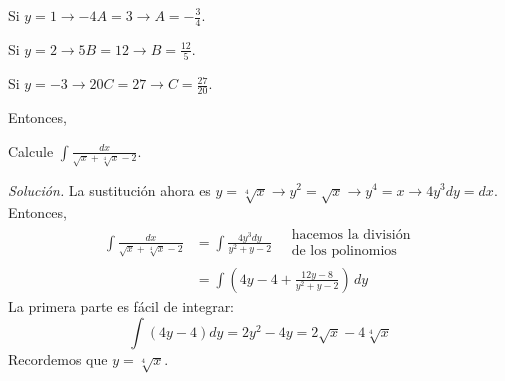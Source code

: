 Si $y=1 \rightarrow -4A=3\rightarrow A=-\frac{3}{4}$.

Si $y=2\rightarrow 5B=12\rightarrow B=\frac{12}{5}$.

Si $y=-3\rightarrow 20C=27\rightarrow C=\frac{27}{20}$.

Entonces,




\begin{ejemplo}
Calcule $\displaystyle{\int \frac{dx}{\sqrt{x}+\sqrt[4]{x}-2}}$.
\end{ejemplo}
\textit{Solución.} La sustitución ahora es $y=\sqrt[4]{x}\rightarrow y^{2}=\sqrt{x}\rightarrow y^{4}=x\rightarrow 4y^{3}dy=dx$. Entonces,
\begin{align*}
\int \frac{dx}{\sqrt{x}+\sqrt[4]{x}-2}&=\int \frac{4y^{3}dy}{y^{2}+y-2}\quad \substack{\text{hacemos la división}\\\text{de los polinomios}} \\
&=\int\left( 4y-4+\frac{12y-8}{y^{2}+y-2}\right)\, dy
\end{align*}
La primera parte es fácil de integrar:
\[
\int (4y-4) dy=2y^{2}-4y=2\sqrt{x}-4\sqrt[4]{x}
\]
Recordemos que $y=\sqrt[4]{x}$.


